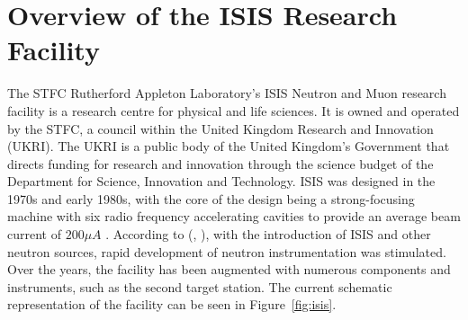 \documentclass[10pt,oneside]{report}
\renewcommand{\citet}[1]{\citeauthor{#1}, \citeyear{#1}}
\begin{document}


\section{Overview of the ISIS Research Facility}\label{sec:isisbg}

The STFC Rutherford Appleton Laboratory's ISIS Neutron and Muon research facility is a research centre for physical and life sciences. It is owned and operated by the STFC, a council within the United Kingdom Research and Innovation (UKRI). The UKRI is a public body of the United Kingdom's Government that directs funding for research and innovation through the science budget of the Department for Science, Innovation and Technology. ISIS was designed in the 1970s and early 1980s, with the core of the design being a strong-focusing machine with six radio frequency accelerating cavities to provide an average beam current of $200\mu A$ \cite{thomason2019isis}. According to (\citet{thomason2019isis}), with the introduction of ISIS and other neutron sources, rapid development of neutron instrumentation was stimulated. Over the years, the facility has been augmented with numerous components and instruments, such as the second target station. The current schematic representation of the facility can be seen in Figure~\ref{fig:isis}.
\end{document}
